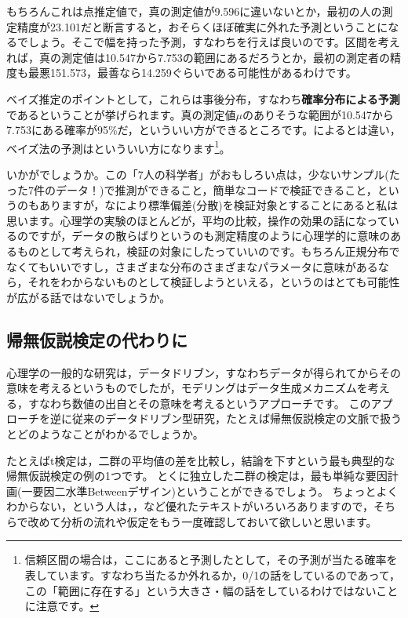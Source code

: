 \documentclass{ltjsbook}
\begin{document}
もちろんこれは点推定値で，真の測定値が9.596に違いないとか，最初の人の測定精度が23.101だと断言すると，おそらくほぼ確実に外れた予測ということになるでしょう。そこで幅を持った予測，すなわちを行えば良いのです。区間を考えれば，真の測定値は10.547から7.753の範囲にあるだろうとか，最初の測定者の精度も最悪151.573，最善なら14.259ぐらいである可能性があるわけです。

ベイズ推定のポイントとして，これらは事後分布，すなわち\textbf{確率分布による予測}であるということが挙げられます。真の測定値$\mu$のありそうな範囲が10.547から7.753にある確率が95\%だ，といういい方ができるところです。によるとは違い，ベイズ法の予測はといういい方になります\footnote{信頼区間の場合は，ここにあると予測したとして，その予測が当たる確率を表しています。すなわち当たるか外れるか，0/1の話をしているのであって，この「範囲に存在する」という大きさ・幅の話をしているわけではないことに注意です。}。

いかがでしょうか。この「7人の科学者」がおもしろい点は，少ないサンプル(たった7件のデータ！)で推測ができること，簡単なコードで検証できること，というのもありますが，なにより標準偏差(分散)を検証対象とすることにあると私は思います。心理学の実験のほとんどが，平均の比較，操作の効果の話になっているのですが，データの散らばりというのも測定精度のように心理学的に意味のあるものとして考えられ，検証の対象にしたっていいのです。もちろん正規分布でなくてもいいですし，さまざまな分布のさまざまなパラメータに意味があるなら，それをわからないものとして検証しようといえる，というのはとても可能性が広がる話ではないでしょうか。

\subsection{帰無仮説検定の代わりに}
心理学の一般的な研究は，データドリブン，すなわちデータが得られてからその意味を考えるというものでしたが，モデリングはデータ生成メカニズムを考える，すなわち数値の出自とその意味を考えるというアプローチです。
このアプローチを逆に従来のデータドリブン型研究，たとえば帰無仮説検定の文脈で扱うとどのようなことがわかるでしょうか。

たとえばt検定は，二群の平均値の差を比較し，結論を下すという最も典型的な帰無仮説検定の例の1つです。
とくに独立した二群の検定は，最も単純な要因計画(一要因二水準Betweenデザイン)ということができるでしょう。
ちょっとよくわからない，という人は，\textcite{Yamada2004}，\textcite{Shimizu2021}など優れたテキストがいろいろありますので，そちらで改めて分析の流れや仮定をもう一度確認しておいて欲しいと思います。
\end{document}
